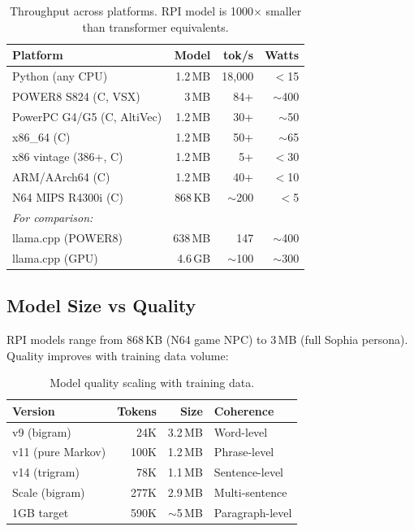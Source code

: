 \documentclass[10pt,twocolumn]{article}
\begin{document}
\begin{table}[h]
\centering
\small
\begin{tabular}{lrrr}
\toprule
\textbf{Platform} & \textbf{Model} & \textbf{tok/s} & \textbf{Watts} \\
\midrule
Python (any CPU) & 1.2\,MB & 18,000 & $<$15 \\
POWER8 S824 (C, VSX) & 3\,MB & 84+ & $\sim$400 \\
PowerPC G4/G5 (C, AltiVec) & 1.2\,MB & 30+ & $\sim$50 \\
x86\_64 (C) & 1.2\,MB & 50+ & $\sim$65 \\
x86 vintage (386+, C) & 1.2\,MB & 5+ & $<$30 \\
ARM/AArch64 (C) & 1.2\,MB & 40+ & $<$10 \\
N64 MIPS R4300i (C) & 868\,KB & $\sim$200 & $<$5 \\
\midrule
\multicolumn{4}{l}{\emph{For comparison:}} \\
llama.cpp (POWER8) & 638\,MB & 147 & $\sim$400 \\
llama.cpp (GPU) & 4.6\,GB & $\sim$100 & $\sim$300 \\
\bottomrule
\end{tabular}
\caption{Throughput across platforms. RPI model is 1000$\times$ smaller than transformer equivalents.}
\label{tab:throughput}
\end{table}

\subsection{Model Size vs Quality}

RPI models range from 868\,KB (N64 game NPC) to 3\,MB (full Sophia persona). Quality improves with training data volume:

\begin{table}[h]
\centering
\small
\begin{tabular}{lrrl}
\toprule
\textbf{Version} & \textbf{Tokens} & \textbf{Size} & \textbf{Coherence} \\
\midrule
v9 (bigram) & 24K & 3.2\,MB & Word-level \\
v11 (pure Markov) & 100K & 1.2\,MB & Phrase-level \\
v14 (trigram) & 78K & 1.1\,MB & Sentence-level \\
Scale (bigram) & 277K & 2.9\,MB & Multi-sentence \\
1GB target & 590K & $\sim$5\,MB & Paragraph-level \\
\bottomrule
\end{tabular}
\caption{Model quality scaling with training data.}
\label{tab:quality}
\end{table}
\end{document}
